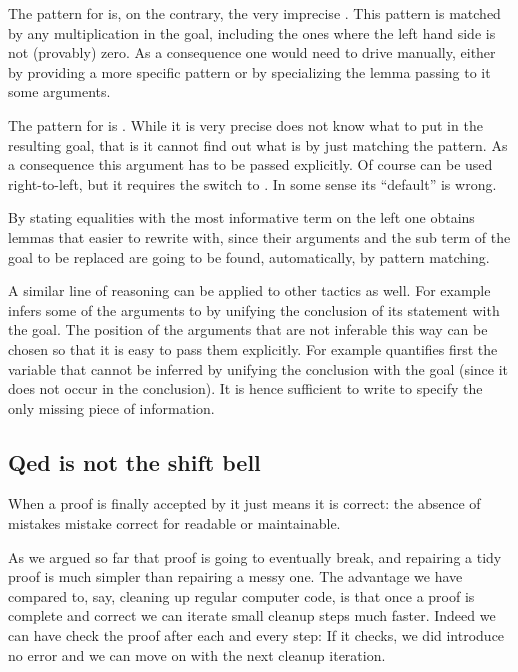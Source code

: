 The pattern for
 is, on the contrary, the very imprecise \C{(\_ * \_)}.
This pattern is matched by any multiplication in the goal, including
the ones where the left hand side is not (provably) zero. As a consequence
one would need to drive  manually, either by providing
a more specific pattern or by specializing the lemma passing to it
some arguments.

The pattern for  is . While it is very precise
 does not know what to put in the resulting goal, that is
it cannot find out what  is by just matching the pattern.
As a consequence this argument has to be passed explicitly.
Of course  can be used right-to-left, but it requires the
\C{$~$-}
switch to . In some sense its ``default'' is wrong.

By stating equalities with the most informative term on the left one
obtains lemmas that easier to rewrite with, since their
arguments and the sub term of the goal to be replaced are going to be
found, automatically, by pattern matching.

A similar line of reasoning can be applied to other tactics as well. For
example  infers some of the arguments to  by unifying the
conclusion of its statement with the goal. The position of the arguments that
are not inferable this way can be chosen so that it is easy to pass them
explicitly.  For example  quantifies first the variable that cannot be inferred by unifying the
conclusion with the goal (since it does not occur in the conclusion).
It is hence sufficient to write  to specify the only
missing piece of information.

\subsection{Qed is not the shift bell}

When a proof is finally accepted by \Coq{} it just means it is correct:
the absence of mistakes  mistake correct for readable or maintainable.

As we argued so far that proof is going to eventually break, and repairing a
tidy proof is much simpler than repairing a messy one.  
The advantage we have compared to, say, cleaning up regular computer code, is
that once a proof is complete and correct we can iterate small cleanup steps
much faster. Indeed we can have \Coq{} check the proof after each and every
step: If it checks, we did introduce no error and we can move on with the next
cleanup iteration.

